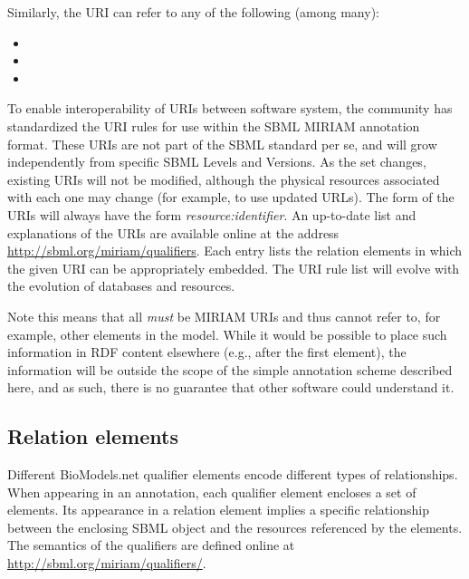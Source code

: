 Similarly, the URI  can refer to
any of the following (among many):
\begin{itemize}\setlength{\parskip}{-0.7ex}

\item {}
\item {}
\item {}

\end{itemize}\vspace*{-1ex}

To enable interoperability of URIs between software system, the
community has standardized the URI rules for use within the SBML
MIRIAM annotation format.  These URIs are not part of the SBML
standard per se, and will grow independently from specific SBML
Levels and Versions.  As the set changes, existing URIs will not
be modified, although the physical resources associated with each
one may change (for example, to use updated URLs).  The form of
the URIs will always have the form \emph{resource:identifier}.  An
up-to-date list and explanations of the URIs are available online
at the address \url{http://sbml.org/miriam/qualifiers}.  Each
entry lists the relation elements in which the given URI can be
appropriately embedded.  The URI rule list will evolve with the
evolution of databases and resources.

Note this means that all  \emph{must} be
MIRIAM URIs and thus cannot refer to, for example, other elements
in the model.  While it would be possible to place such
information in RDF content elsewhere (e.g., after the first
 element), the information will be outside
the scope of the simple annotation scheme described here, and as
such, there is no guarantee that other software could understand
it.


\subsection{Relation elements}
\label{sec:qualified-dc-annotation}

Different BioModels.net qualifier elements encode different types
of relationships.  When appearing in an annotation, each qualifier
element encloses a set of  elements.  Its appearance
in a relation element implies a specific relationship between the
enclosing SBML object and the resources referenced by the
 elements.  The semantics of the qualifiers are
defined online at \url{http://sbml.org/miriam/qualifiers/}.

